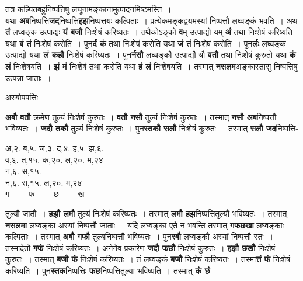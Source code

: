 \documentclass[11pt, openany]{book}
\begin{document}
{\ab  तत्र कल्पितबहुनिष्पत्तिषु लघूनामङ्कानामुत्पादनमिष्टमस्ति~। }\\

 यथा \textbf{अब}निष्पत्ति\textbf{जद}निष्पत्ति\textbf{हझ}निष्पत्तयः कल्पिताः~। प्रत्येकमङ्कद्वयमस्यां निष्पत्तौ लघ्वङ्कं भवति~। अथ \textbf{तं} लघ्वङ्क उत्पाद्यः \textbf{यं बजौ} निःशेषं करिष्यतः~। तथैकोऽङ्को \textbf{व}म् उत्पाद्यो यम् \textbf{अं} तथा निःशेषं करिष्यति यथा \textbf{बं तं} निःशेषं करोति~। पुन\textbf{र्दं कं} तथा निःशेषं करोति यथा \textbf{जं तं} निःशेषं करोति~। पुन\textbf{र्लः} लघ्वङ्क उत्पाद्यो यथा \textbf{लं कहौ} निःशेषं करिष्यतः~। पुन\textbf{र्नसौ} लघ्वङ्कौ उत्पाद्यौ यौ \textbf{वतौ} तथा निःशेषं कुरुतो यथा \textbf{कं लं} निःशेषयति~। \textbf{झं मं} निःशेषं तथा करोति यथा \textbf{हं लं} निःशेषयति~। तस्मात् \textbf{नसलम}अङ्कास्तासु निष्पत्तिषु उत्पन्ना जाताः~। 

\begin{center}
 अस्योपपत्तिः~। 
\end{center}

\begin{flushleft}
\begin{minipage}[t]{0.42\textwidth}
\hspace{4mm}  \textbf{अबौ वतौ} क्रमेण तुल्यं निःशेषं कुरुतः~। \textbf{वतौ नसौ} तुल्यं  निःशेषं  कुरुतः~। तस्मात् \textbf{नसौ अब}निष्पत्तौ भविष्यतः~। \textbf{जदौ तकौ} तुल्यं निःशेषं कुरुतः~। \;पुन\textbf{स्तकौ \;सलौ} \;निःशेषं कुरुतः~। तस्मात् \textbf{सलौ  जद}निष्पत्ति-
\end{minipage} 
\hfill
\begin{minipage}[t]{0.48\textwidth}
अ,२. ब,५. ज,३. द,४. ह,५. झ,६.\\
व,६. त,१५. क,२०. ल,२०. म,२४\\
न,६. स,१५.\\
न,६. स,१५. ल,२०. म,२४\\
ग - - - फ - - - छ - - - ख - - - 
\end{minipage}
\end{flushleft}
\vspace{-3mm}

\noindent तुल्यौ जातौ~। \textbf{हझौ लमौ} तुल्यं निःशेषं करिष्यतः~। तस्मात् \textbf{लमौ हझ}निष्पत्तितुल्यौ भविष्यतः~। तस्मात् \textbf{नसलमा} लघ्वङ्का अस्यां निष्पत्तौ जाताः~। यदि लघ्वङ्का एते न भवन्ति तस्मात् \textbf{गफछखा} लघ्वङ्काः कल्पिताः~। तस्मात् \textbf{अबौ गफौ} तुल्यनिष्पत्तौ भविष्यतः~। पुन\textbf{रबौ} लघ्वङ्कौ अस्यां निष्पत्तौ स्तः~। तस्मादेतौ \textbf{गफं} निःशेषं करिष्यतः~। अनेनैव प्रकारेण \textbf{जदौ फछौ} निःशेषं कुरुतः~। \textbf{हझौ छखौ} निःशेषं कुरुतः~। तस्मात् \textbf{बजौ फं} निःशेषं करिष्यतः~। तं लघ्वङ्कं \textbf{बजौ} निःशेषं करिष्यतः~। तस्मा\textbf{त्तं फं} निःशेषं करिष्यति~। पुन\textbf{स्तक}निष्पत्तिः \textbf{फछ}निष्पत्तितुल्या भविष्यति~। तस्मात् \textbf{कं छं} 
\end{document}
